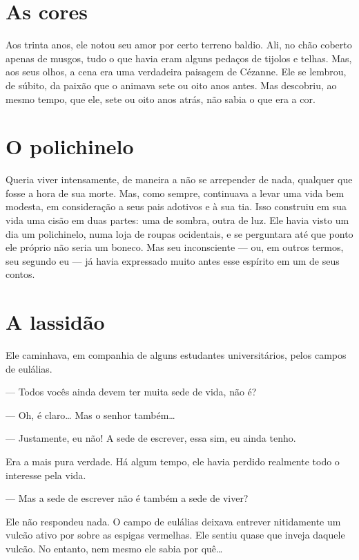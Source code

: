 \section{As cores}

Aos trinta anos, ele notou seu amor por certo terreno baldio. Ali, no
chão coberto apenas de musgos, tudo o que havia eram alguns pedaços de
tijolos e telhas. Mas, aos seus olhos, a cena era uma verdadeira
paisagem de Cézanne. Ele se lembrou, de súbito, da paixão que o animava
sete ou oito anos antes. Mas descobriu, ao mesmo tempo, que ele, sete
ou oito anos atrás, não sabia o que era a cor.

\section{O polichinelo}

Queria viver intensamente, de maneira a não se arrepender de nada,
qualquer que fosse a hora de sua morte. Mas, como sempre, continuava a
levar uma vida bem modesta, em consideração a seus pais adotivos e à
sua tia. Isso construiu em sua vida uma cisão em duas partes: uma de
sombra, outra de luz. Ele havia visto um dia um polichinelo, numa loja
de roupas ocidentais, e se perguntara até que ponto ele próprio não
seria um boneco. Mas seu inconsciente --- ou, em outros termos, seu
segundo eu --- já havia expressado muito antes esse espírito em um de
seus contos.

\section{A lassidão}

Ele caminhava, em companhia de alguns estudantes universitários, pelos
campos de eulálias.

--- Todos vocês ainda devem ter muita sede de vida, não é?

--- Oh, é claro\ldots{} Mas o senhor também\ldots{}

--- Justamente, eu não! A sede de escrever, essa sim, eu ainda tenho.

Era a mais pura verdade. Há algum tempo, ele havia perdido realmente
todo o interesse pela vida.

--- Mas a sede de escrever não é também a sede de viver?

Ele não respondeu nada. O campo de eulálias deixava entrever nitidamente
um vulcão ativo por sobre as espigas vermelhas. Ele sentiu quase que
inveja daquele vulcão. No entanto, nem mesmo ele sabia por quê\ldots{}

